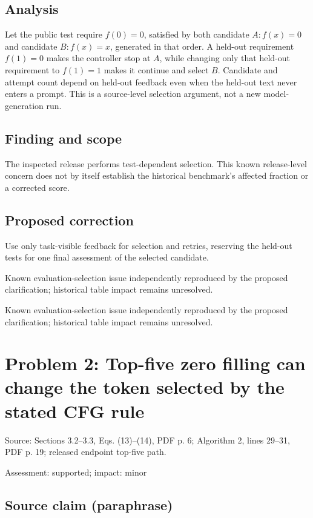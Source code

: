\documentclass[11pt]{article}
\begin{document}
\subsection*{Analysis}

Let the public test require \(f(0)=0\), satisfied by both candidate \(A:f(x)=0\) and candidate \(B:f(x)=x\), generated in that order. A held-out requirement \(f(1)=0\) makes the controller stop at \(A\), while changing only that held-out requirement to \(f(1)=1\) makes it continue and select \(B\). Candidate and attempt count depend on held-out feedback even when the held-out text never enters a prompt. This is a source-level selection argument, not a new model-generation run.

\subsection*{Finding and scope}

The inspected release performs test-dependent selection. This known release-level concern does not by itself establish the historical benchmark's affected fraction or a corrected score.

\subsection*{Proposed correction}

Use only task-visible feedback for selection and retries, reserving the held-out tests for one final assessment of the selected candidate.

Known evaluation-selection issue independently reproduced by the proposed clarification; historical table impact remains unresolved.

Known evaluation-selection issue independently reproduced by the proposed clarification; historical table impact remains unresolved.

\section*{Problem 2: Top-five zero filling can change the token selected by the stated CFG rule}

Source: Sections 3.2–3.3, Eqs. (13)–(14), PDF p. 6; Algorithm 2, lines 29–31, PDF p. 19; released endpoint top-five path.

Assessment: supported; impact: minor

\subsection*{Source claim (paraphrase)}
\end{document}
